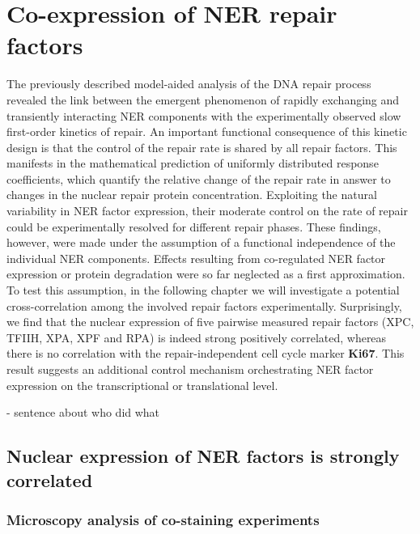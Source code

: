 \chapter{Co-expression of NER repair factors}
The previously described model-aided analysis of the DNA repair process revealed the link between the emergent phenomenon of rapidly exchanging and transiently interacting NER components with the experimentally observed slow first-order kinetics of repair. An important functional consequence of this kinetic design is that the control of the repair rate is shared by all repair factors. This manifests in the mathematical prediction of uniformly distributed response coefficients, which quantify the relative change of the repair rate in answer to changes in the nuclear repair protein concentration. Exploiting the natural variability in NER factor expression, their moderate control on the rate of repair could be experimentally resolved for different repair phases. These findings, however, were made under the assumption of a functional independence of the individual NER components. Effects resulting from co-regulated NER factor expression or protein degradation were so far neglected as a first approximation.  \\
To test this assumption, in the following chapter we will investigate a potential cross-correlation among the involved repair factors experimentally. Surprisingly, we find that the nuclear expression of five pairwise measured repair factors (XPC, TFIIH, XPA, XPF and RPA) is indeed strong positively correlated, whereas there is no correlation with the repair-independent cell cycle marker \textbf{Ki67}. This result suggests an additional control mechanism orchestrating NER factor expression on the transcriptional or translational level.    

- sentence about who did what

\section{Nuclear expression of NER factors is strongly correlated}

\subsection{Microscopy analysis of co-staining experiments}


